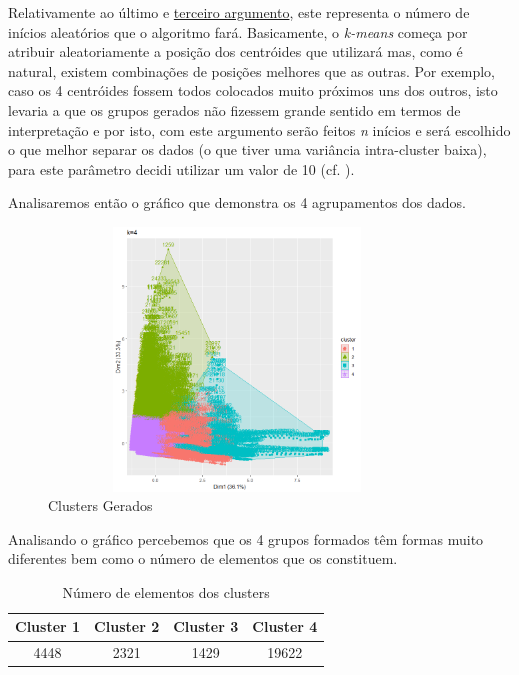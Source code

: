 \documentclass[a4paper,12pt]{article}
\begin{document}
Relativamente ao último e \underline{terceiro argumento}, este representa o número de inícios aleatórios que o algoritmo fará. Basicamente, o \textit{k-means} começa por atribuir aleatoriamente a posição dos centróides que utilizará mas, como é natural, existem combinações de posições melhores que as outras. Por exemplo, caso os 4 centróides fossem todos colocados muito próximos uns dos outros, isto levaria a que os grupos gerados não fizessem grande sentido em termos de interpretação e por isto, com este argumento serão feitos \textit{n} inícios e será escolhido o que melhor separar os dados (o que tiver uma variância intra-cluster baixa), para este parâmetro decidi utilizar um valor de 10 (cf. \cite{nstart}).

Analisaremos então o gráfico que demonstra os 4 agrupamentos dos dados.

\begin{center} %
	\begin{figure}[H]
		\centering
		\includegraphics[width=10cm, height=7cm]{clusters4.png}
		\caption{Clusters Gerados}
		\label{fig:clusters}
	\end{figure}
\end{center}


Analisando o gráfico percebemos que os 4 grupos formados têm formas muito diferentes bem como o número de elementos que os constituem.

\begin{table}[H]
	\centering
	\caption{Número de elementos dos clusters}
	\begin{tabular}{|c|c|c|c|} 
		\hline
		\rowcolor[rgb]{0.706,0.922,0.996} Cluster 1 & Cluster 2 & Cluster 3 & Cluster 4  \\ 
		\hline
		4448                                        & 2321      & 1429      & 19622      \\
		\hline
	\end{tabular}
\end{table}
\end{document}
